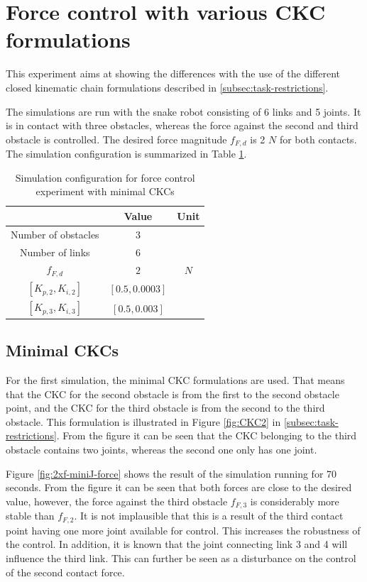 \section{Force control with various CKC formulations}\label{sec:2xminiJforce}

This experiment aims at showing the differences with the use of the different closed kinematic chain formulations described in \ref{subsec:task-restrictions}.

The simulations are run with the snake robot consisting of 6 links and 5 joints. It is in contact with three obstacles, whereas the force against the second and third obstacle is controlled. The desired force magnitude $f_{F,d}$ is 2 $N$ for both contacts. The simulation configuration is summarized in Table \ref{tab:exp_2xf}.

\begin{table}[]
    \centering
    \begin{tabular}{|c|c|c|}
        \hline
        & Value & Unit\\
        \hline
        Number of obstacles & $3$ & \\
        Number of links & $6$ & \\
        $f_{F,d}$ & $2$ & $N$ \\
        $[K_{p,2}, K_{i,2}]$ & $[0.5, 0.0003]$ &\\
        $[K_{p,3}, K_{i,3}]$ & $[0.5, 0.003]$ &\\
        \hline
    \end{tabular}
    \caption{Simulation configuration for force control experiment with minimal CKCs}
    \label{tab:exp_2xf}
\end{table}

\subsection{Minimal CKCs}

For the first simulation, the minimal CKC formulations are used. That means that the CKC for the second obstacle is from the first to the second obstacle point, and the CKC for the third obstacle is from the second to the third obstacle. This formulation is illustrated in Figure \ref{fig:CKC2} in \ref{subsec:task-restrictions}. From the figure it can be seen that the CKC belonging to the third obstacle contains two joints, whereas the second one only has one joint.

Figure \ref{fig:2xf-miniJ-force} shows the result of the simulation running for 70 seconds. From the figure it can be seen that both forces are close to the desired value, however, the force against the third obstacle $f_{F,3}$ is considerably more stable than $f_{F,2}$. It is not implausible that this is a result of the third contact point having one more joint available for control. This increases the robustness of the control. In addition, it is known that the joint connecting link 3 and 4 will influence the third link. This can further be seen as a disturbance on the control of the second contact force.

